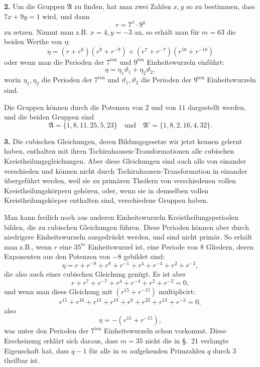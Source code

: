 \documentclass[12pt,a4paper]{article}
\theoremstyle{plain}
\theoremstyle{definition}
\theoremstyle{remark}
\begin{document}
\medskip\noindent\textbf{2.} Um die Gruppen $\mathfrak{A}$ zu finden, hat man zwei Zahlen $x, y$ so zu bestimmen, dass $7x + 9y = 1$ wird, und dann
\[
r = 7^x \cdot 9^y
\]
zu setzen. Nimmt man z.B. $x = 4, y = -3$ an, so erhält man für $m = 63$ die beiden Werthe von $\eta$:
\[
\eta = (r + r^8)(r^9 + r^{-9}) + (r^7 + r^{-7})(r^{18} + r^{-18})
\]
oder wenn man die Perioden der $7^{\text{ten}}$ und $9^{\text{ten}}$ Einheitswurzeln einführt:
\[
\eta = \eta_1 \vartheta_1 + \eta_2 \vartheta_2,
\]
worin $\eta_1, \eta_2$ die Perioden der $7^{\text{ten}}$ und $\vartheta_1, \vartheta_2$ die Perioden der $9^{\text{ten}}$ Einheitswurzeln sind.

Die Gruppen können durch die Potenzen von $2$ und von $11$ dargestellt werden, und die beiden Gruppen sind
\[
\mathfrak{A} = \{1, 8, 11, 25, 5, 23\} \quad \text{und} \quad \mathfrak{A}' = \{1, 8, 2, 16, 4, 32\}.
\]

\medskip\noindent\textbf{3.} Die cubischen Gleichungen, deren Bildungsgesetze wir jetzt kennen gelernt haben, enthalten mit ihren Tschirnhausen-Transformationen alle cubischen Kreistheilungsgleichungen. Aber diese Gleichungen sind auch alle von einander verschieden und können nicht durch Tschirnhausen-Transformation in einander übergeführt werden, weil sie zu primären Theilern von verschiedenen vollen Kreistheilungskörpern gehören, oder, wenn sie in demselben vollen Kreistheilungskörper enthalten sind, verschiedene Gruppen haben.

Man kann freilich noch aus anderen Einheitswurzeln Kreistheilungsperioden bilden, die zu cubischen Gleichungen führen. Diese Perioden können aber durch niedrigere Einheitswurzeln ausgedrückt werden, und sind nicht primär. So erhält man z.B., wenn $r$ eine $35^{\text{te}}$ Einheitswurzel ist, eine Periode von $8$ Gliedern, deren Exponenten aus den Potenzen von $-8$ gebildet sind:
\[
\eta = r + r^{-8} + r^{8} + r^{-1} + r^{4} + r^{-4} + r^{2} + r^{-2},
\]
die also auch einer cubischen Gleichung genügt. Es ist aber
\[
r + r^{7} + r^{-7} + r^{4} + r^{-4} + r^{2} + r^{-2} = 0,
\]
und wenn man diese Gleichung mit $(r^{15} + r^{-15})$ multiplicirt:
\[
r^{15} + r^{16} + r^{13} + r^{18} + r^{8} + r^{22} + r^{13} + r^{-3} = 0,
\]
also
\[
\eta = -(r^{15} + r^{-15}),
\]
was unter den Perioden der $7^{\text{ten}}$ Einheitswurzeln schon vorkommt. Diese Erscheinung erklärt sich daraus, dass $m = 35$ nicht die in \S.~21 verlangte Eigenschaft hat, dass $q-1$ für alle in $m$ aufgehenden Primzahlen $q$ durch $3$ theilbar ist.
\end{document}
